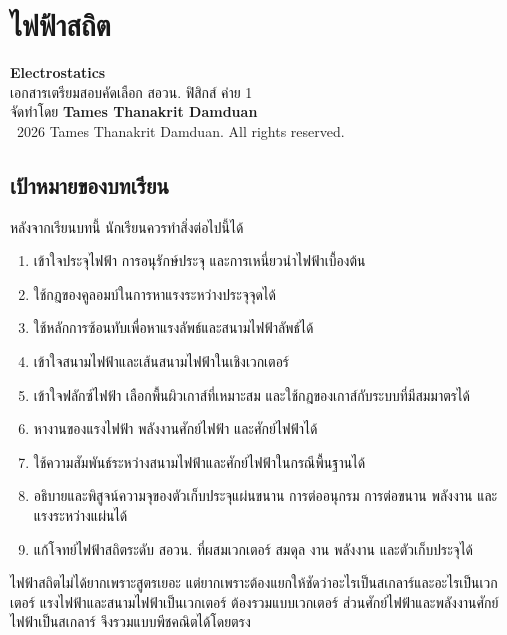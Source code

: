 
\chapter{ไฟฟ้าสถิต}

\begin{center}
    {\Large \textbf{Electrostatics}}\\[4pt]
    {\normalsize เอกสารเตรียมสอบคัดเลือก สอวน. ฟิสิกส์ ค่าย 1}\\[6pt]
    {\normalsize จัดทำโดย \textbf{Tames Thanakrit Damduan}}\\[2pt]
    {\footnotesize \textcopyright\ 2026 Tames Thanakrit Damduan. All rights reserved.}\\[8pt]
\end{center}

\section*{เป้าหมายของบทเรียน}

หลังจากเรียนบทนี้ นักเรียนควรทำสิ่งต่อไปนี้ได้

\begin{enumerate}
    \item เข้าใจประจุไฟฟ้า การอนุรักษ์ประจุ และการเหนี่ยวนำไฟฟ้าเบื้องต้น
    \item ใช้กฎของคูลอมบ์ในการหาแรงระหว่างประจุจุดได้
    \item ใช้หลักการซ้อนทับเพื่อหาแรงลัพธ์และสนามไฟฟ้าลัพธ์ได้
    \item เข้าใจสนามไฟฟ้าและเส้นสนามไฟฟ้าในเชิงเวกเตอร์
    \item เข้าใจฟลักซ์ไฟฟ้า เลือกพื้นผิวเกาส์ที่เหมาะสม และใช้กฎของเกาส์กับระบบที่มีสมมาตรได้
    \item หางานของแรงไฟฟ้า พลังงานศักย์ไฟฟ้า และศักย์ไฟฟ้าได้
    \item ใช้ความสัมพันธ์ระหว่างสนามไฟฟ้าและศักย์ไฟฟ้าในกรณีพื้นฐานได้
    \item อธิบายและพิสูจน์ความจุของตัวเก็บประจุแผ่นขนาน การต่ออนุกรม การต่อขนาน พลังงาน และแรงระหว่างแผ่นได้
    \item แก้โจทย์ไฟฟ้าสถิตระดับ สอวน. ที่ผสมเวกเตอร์ สมดุล งาน พลังงาน และตัวเก็บประจุได้
\end{enumerate}

\begin{tcolorbox}[title=แนวคิดสำคัญของบทนี้]
ไฟฟ้าสถิตไม่ได้ยากเพราะสูตรเยอะ แต่ยากเพราะต้องแยกให้ชัดว่าอะไรเป็นสเกลาร์และอะไรเป็นเวกเตอร์ แรงไฟฟ้าและสนามไฟฟ้าเป็นเวกเตอร์ ต้องรวมแบบเวกเตอร์ ส่วนศักย์ไฟฟ้าและพลังงานศักย์ไฟฟ้าเป็นสเกลาร์ จึงรวมแบบพีชคณิตได้โดยตรง
\end{tcolorbox}

